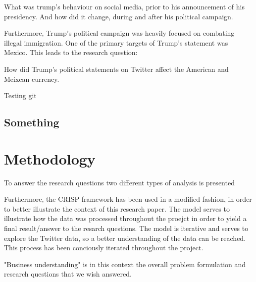 \documentclass{article}
\begin{document}
\par\vspace{10pt}

What was trump's behaviour on social media, prior to his announcement of his presidency. And how did it change, during and after his political campaign.

\par\vspace{10pt}

Furthermore, Trump's political campaign was heavily focused on combating illegal immigration. One of the primary targets of Trump's statement was Mexico.
This leads to the research question:

How did Trump's political statements on Twitter affect the American and Meixcan currency.

Testing git

\par\vspace{10pt}






\subsection{Something}




\section{Methodology}
To answer the research questions two different types of analysis is presented

Furthermore,  the CRISP framework has been used in a modified fashion, in order to better illustrate the context of this research paper.
The model serves to illustrate how the data was processed throughout the proejct in order to yield a final result/answer to the resarch questions. The model is iterative and serves to explore the Twitter data, so a better
understanding of the data can be reached. This process has been conciously iterated throughout the project.

"Business understanding" is in this context the overall problem formulation and research questions that we wish answered.
\end{document}
